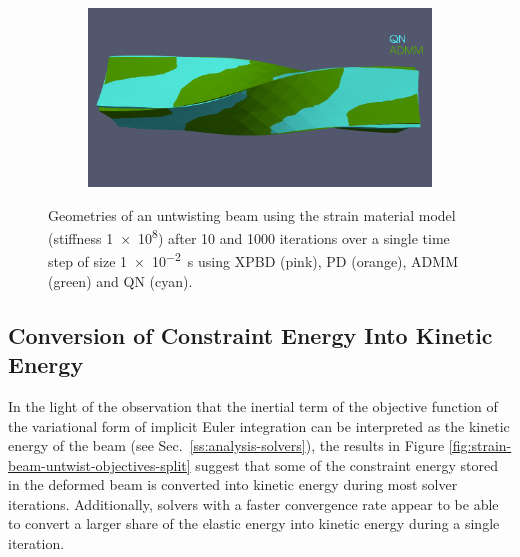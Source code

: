 \begin{figure}[h]
\begin{subfigure}{0.49\textwidth}
    \end{subfigure}
    \hspace{0.001\textwidth}
    \begin{subfigure}{0.49\textwidth}
        \includegraphics[width=\textwidth, trim={0 4.5cm 0 2.15cm}, clip]{figures/strain_beam_untwist_QN_vs_ADMM_10_iterations.png}
    \end{subfigure}
    \caption{Geometries of an untwisting beam using the strain material model (stiffness \num{1e8}) after 10 and 1000 iterations over a single time step of size 
        \SI{1e-2}{\second} using XPBD (pink), PD (orange), ADMM (green) and QN (cyan).}
    \label{fig:strain-beam-untwist-geometries}
\end{figure}

\subsection{Conversion of Constraint Energy Into Kinetic Energy}\label{ss:conversion-constraint-kinetic}
In the light of the observation that the inertial term of the objective function of the variational form of implicit Euler integration can be interpreted as the kinetic 
energy of the beam (see Sec.\ \ref{ss:analysis-solvers}), the results in Figure \ref{fig:strain-beam-untwist-objectives-split} suggest that some of the 
constraint energy stored in the deformed beam is converted into kinetic energy during most solver iterations. Additionally, solvers with a 
faster convergence rate appear to be able to convert a larger share of the elastic energy into kinetic energy during a single iteration. 

